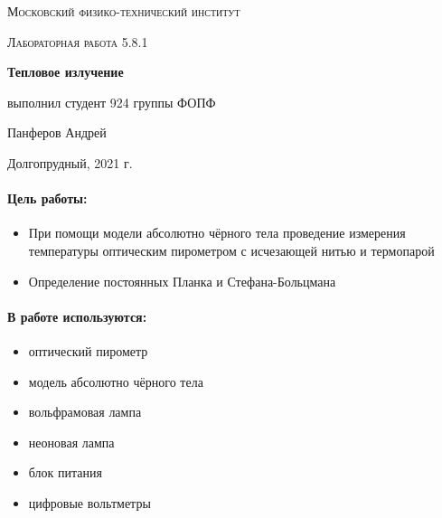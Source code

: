 \documentclass[a4paper, 12pt]{article}
\begin{document}
	
\begin{titlepage}
	\centering
	\vspace{5cm}
	{\scshape\LARGE Московский физико-технический институт \par}
	\vspace{4cm}
	{\scshape\Large Лабораторная работа 5.8.1 \par}
	\vspace{1cm}
	{\huge\bfseries Тепловое излучение \par}
	\vspace{1cm}
	\vfill
\begin{flushright}
	{\large выполнил студент 924 группы ФОПФ}\par
	\vspace{0.3cm}
	{\LARGE Панферов Андрей}
\end{flushright}
	

	\vfill

	Долгопрудный, 2021 г.
\end{titlepage}

\paragraph*{Цель работы:} 
\begin{itemize}
    \item При помощи модели абсолютно чёрного тела проведение измерения температуры оптическим пирометром с исчезающей нитью и термопарой
    \item Определение постоянных Планка и Стефана-Больцмана
\end{itemize}

\paragraph*{В работе используются:}
\begin{itemize}
    \item оптический пирометр
    \item модель абсолютно чёрного тела
    \item вольфрамовая лампа
    \item неоновая лампа
    \item блок питания
    \item цифровые вольтметры
\end{itemize}
\end{document}
